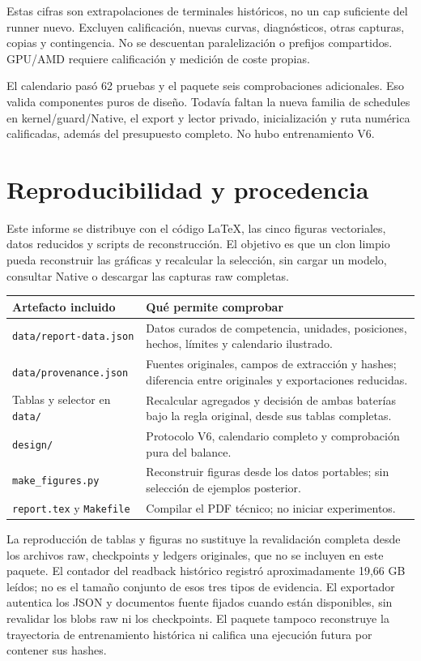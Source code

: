 \documentclass[11pt,a4paper]{article}
\newcommand{\pageend}{\clearpage}
\begin{document}
Estas cifras son extrapolaciones de terminales históricos, no un cap suficiente
del runner nuevo. Excluyen calificación, nuevas curvas, diagnósticos, otras
capturas, copias y contingencia. No se descuentan paralelización o prefijos
compartidos. GPU/AMD requiere calificación y medición de coste propias.

El calendario pasó 62 pruebas y el paquete seis comprobaciones adicionales. Eso
valida componentes puros de diseño. Todavía faltan la nueva familia de schedules
en kernel/guard/Native, el export y lector privado, inicialización y ruta numérica
calificadas, además del presupuesto completo. No hubo entrenamiento V6.

\pageend
\section{Reproducibilidad y procedencia}
\label{sec:provenance}

Este informe se distribuye con el código LaTeX, las cinco figuras vectoriales,
datos reducidos y scripts de reconstrucción. El objetivo es que un clon limpio
pueda reconstruir las gráficas y recalcular la selección, sin cargar un modelo,
consultar Native o descargar las capturas raw completas.

\begin{tabularx}{\linewidth}{@{}p{43mm}Y@{}}
\toprule
\textbf{Artefacto incluido} & \textbf{Qué permite comprobar}\\
\midrule
\texttt{data/report-data.json} & Datos curados de competencia, unidades, posiciones, hechos, límites y calendario ilustrado.\\
\texttt{data/provenance.json} & Fuentes originales, campos de extracción y hashes; diferencia entre originales y exportaciones reducidas.\\
Tablas y selector en \texttt{data/} & Recalcular agregados y decisión de ambas baterías bajo la regla original, desde sus tablas completas.\\
\texttt{design/} & Protocolo V6, calendario completo y comprobación pura del balance.\\
\texttt{make\_figures.py} & Reconstruir figuras desde los datos portables; sin selección de ejemplos posterior.\\
\texttt{report.tex} y \texttt{Makefile} & Compilar el PDF técnico; no iniciar experimentos.\\
\bottomrule
\end{tabularx}

La reproducción de tablas y figuras no sustituye la revalidación completa desde
los archivos raw, checkpoints y ledgers originales, que no se incluyen en este
paquete. El contador del readback histórico registró aproximadamente 19,66 GB
leídos; no es el tamaño conjunto de esos tres tipos de evidencia. El exportador
autentica los JSON y documentos fuente fijados cuando están disponibles, sin
revalidar los blobs raw ni los checkpoints. El paquete tampoco reconstruye la trayectoria
de entrenamiento histórica ni califica una ejecución futura por contener sus hashes.
\end{document}
